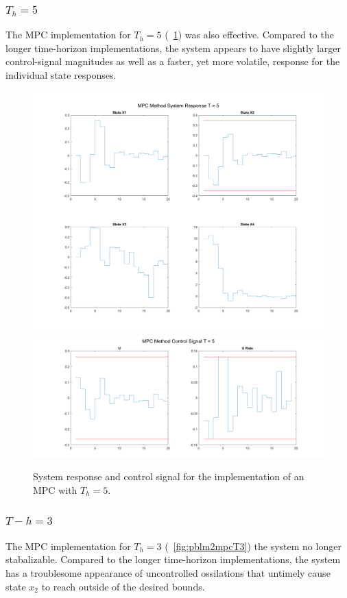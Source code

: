 \documentclass[letter]{article}
\begin{document}
\subsubsection{$T_h = 5$}
The MPC implementation for $T_h = 5$ (\figurename \ \ref{fig:pblm2mpcT5}) was also effective. Compared to the longer time-horizon implementations, the system appears to have slightly larger control-signal magnitudes as well as a faster, yet more volatile, response for the individual state responses.

\begin{figure}[p]
	\centering
	\includegraphics[width=\linewidth]{fig/pblm2_MPC_T5_sys_response}
	\includegraphics[width=\linewidth]{fig/pblm2_MPC_T5_ctrl_signal}
	\caption{System response and control signal for the implementation of an MPC with $T_h = 5$.}
	\label{fig:pblm2mpcT5}
\end{figure}

\subsubsection{$T-h = 3$}
The MPC implementation for $T_h = 3$ (\figurename \ \ref{fig:pblm2mpcT3}) the system no longer stabalizable. Compared to the longer time-horizon implementations, the system has a troublesome appearance of uncontrolled ossilations that untimely cause state $x_2$ to reach outside of the desired bounds.
\end{document}
